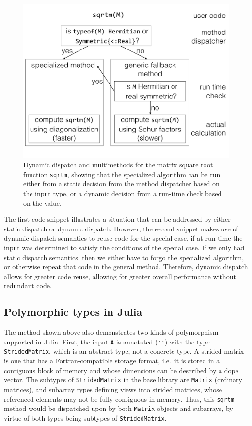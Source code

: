 \begin{figure}
	\centering
	\includegraphics[width=\columnwidth]{fig-sqrtm}
	\caption{Dynamic dispatch and multimethods for the matrix square root
		function \texttt{sqrtm}, showing that the specialized algorithm
		can be run either from a static decision from the method
		dispatcher based on the input type, or a dynamic decision from
		a run-time check based on the value.}
	\label{fig:sqrtm}
\end{figure}

The first code snippet illustrates a situation that can be addressed by either
static dispatch or dynamic dispatch. However, the second snippet makes use of
dynamic dispatch semantics to reuse code for the special case, if at run time
the input was determined to satisfy the conditions of the special case. If we
only had static dispatch semantics, then we either have to forgo the
specialized algorithm, or otherwise repeat that code in the general method.
Therefore, dynamic dispatch allows for greater code reuse, allowing for greater
overall performance without redundant code.



\subsection{Polymorphic types in Julia}

The method shown above also demonstrates two kinds of polymorphism supported in
Julia. First, the input \lstinline|A| is annotated (\lstinline|::|) with the
type \lstinline|StridedMatrix|, which is an abstract type, not a concrete type.
A strided matrix is one that has a Fortran-compatible storage format, i.e.\ it
is stored in a contiguous block of memory and whose dimensions can be described
by a dope vector. The subtypes of \lstinline|StridedMatrix| in the base
library are \lstinline|Matrix| (ordinary matrices), and subarray types defining
views into strided matrices, whose referenced elements may not be fully
contiguous in memory. Thus, this \lstinline|sqrtm| method would be
dispatched upon by both \lstinline|Matrix| objects and subarrays, by virtue of
both types being subtypes of \lstinline|StridedMatrix|.


